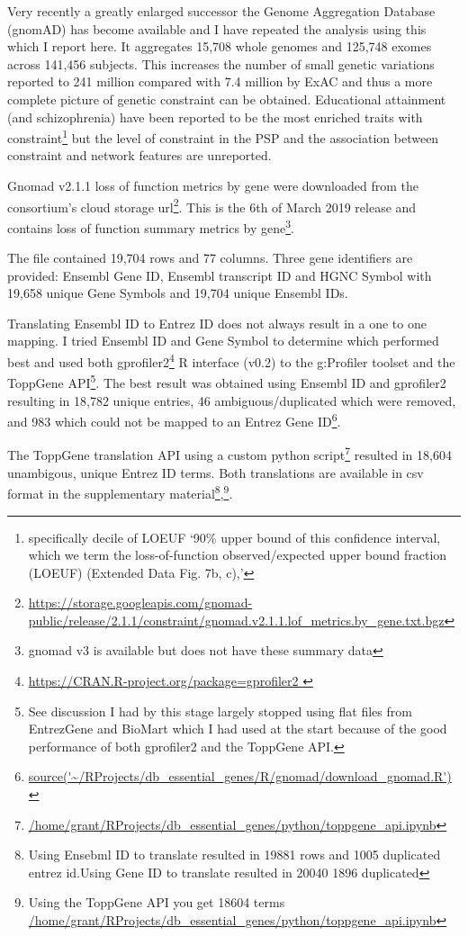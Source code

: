  Very recently a greatly enlarged successor the Genome Aggregation Database (gnomAD) has become available and I have repeated the analysis using this which I report here. It aggregates 15,708 whole genomes and 125,748 exomes across 141,456 subjects. This increases the number of small genetic variations reported to 241 million compared with 7.4 million by ExAC and thus a more complete picture of genetic constraint can be obtained\cite{karczewski2020mutational}. Educational attainment (and schizophrenia) have been reported to be the most enriched traits with constraint\cite{karczewski2020mutational}\footnote{specifically decile of LOEUF `90\% upper bound of this confidence interval, which we term the loss-of-function observed/expected upper bound fraction (LOEUF) (Extended Data Fig. 7b, c),\cite{karczewski2020mutational}'} but the level of constraint in the PSP and the association between constraint and network features are unreported.  

Gnomad v2.1.1 loss of function metrics by gene were downloaded from the consortium's cloud storage url\footnote{\url{https://storage.googleapis.com/gnomad-public/release/2.1.1/constraint/gnomad.v2.1.1.lof_metrics.by_gene.txt.bgz}}. This is the 6th of March 2019 release and contains loss of function summary metrics by gene\footnote{gnomad v3 is available but does not have these summary data}.

The file contained 19,704 rows and 77 columns. Three gene identifiers are provided: Ensembl Gene ID, Ensembl transcript ID and HGNC Symbol with 19,658 unique Gene Symbols and 19,704 unique Ensembl IDs.

Translating Ensembl ID to Entrez ID does not always result in a one to one mapping. I tried Ensembl ID and Gene Symbol to determine which performed best and used both gprofiler2\footnote{\url{https://CRAN.R-project.org/package=gprofiler2 }} R interface (v0.2) to the g:Profiler toolset\cite{raudvere2019g} and the ToppGene API\footnote{See discussion I had by this stage largely stopped using flat files from EntrezGene and BioMart which I had used at the start because of the good performance of both gprofiler2 and the ToppGene API.}. The best result was obtained using Ensembl ID and gprofiler2 resulting in 18,782 unique entries, 46 ambiguous/duplicated which were removed, and 983 which could not be mapped to an Entrez Gene ID\footnote{ \url{source('~/RProjects/db_essential_genes/R/gnomad/download_gnomad.R')}}.

The ToppGene translation API using a custom python script\footnote{\url{/home/grant/RProjects/db_essential_genes/python/toppgene_api.ipynb}} resulted in 18,604 unambigous, unique Entrez ID terms.  Both translations are available in csv format in the supplementary material\footnote{Using Ensebml ID to translate resulted in 19881 rows and 1005 duplicated entrez id.Using Gene ID to translate resulted in 20040 1896 duplicated},\footnote{Using the ToppGene API you get 18604 terms \url{/home/grant/RProjects/db_essential_genes/python/toppgene_api.ipynb}}.

